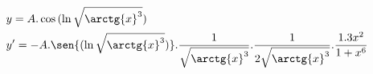 \begin{ex}
\begin{align}
&y=A.\cos{(\ln{\sqrt{\arctg{x}^3}})}\nonumber\\
&y'=-A.\sen{(\ln{\sqrt{\arctg{x}^3}})}.\frac{1}{\sqrt{\arctg{x}^3}}.\frac{1}{2\sqrt{\arctg{x}^3}}.\frac{1.3x^2}{1+x^6}\nonumber
\end{align}
\end{ex}